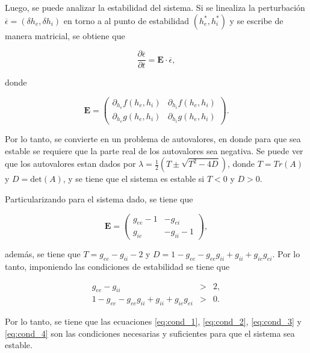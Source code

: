 \documentclass[11pt, twocolumn]{article}
\begin{document}
Luego, se puede analizar la estabilidad del sistema. Si se linealiza la perturbación \(\overline{\epsilon} = (\delta h_e, \delta h_i)\) en torno a al punto de estabilidad \((h_e^*, h_i^*)\) y se escribe de manera matricial, se obtiene que 

\begin{equation*}
    \frac{\partial \overline{\epsilon}}{\partial t} = \mathbf{E} \cdot \overline{\epsilon},
\end{equation*}

\noindent donde 

\begin{equation*}
    \mathbf{E} = \begin{pmatrix}
        \partial_{h_e} f(h_e, h_i) & \partial_{h_i} f(h_e, h_i) \\
        \partial_{h_e} g(h_e, h_i) & \partial_{h_i}g(h_e, h_i)
    \end{pmatrix}.
\end{equation*}

Por lo tanto, se convierte en un problema de autovalores, en donde para que sea estable se requiere que la parte real de los autovalores sea negativa. Se puede ver que los autovalores estan dados por \( \lambda = \frac{1}{2} (T \pm \sqrt{T^2-4D})\), donde \(T = Tr(A)\) y \(D = \text{det}(A)\), y se tiene que el sistema es estable si \(T < 0\) y \(D > 0\).

Particularizando para el sistema dado, se tiene que

\begin{equation*}
    \mathbf{E} = \begin{pmatrix}
        g_{ee} - 1 & -g_{ei} \\
        g_{ie} & -g_{ii} - 1
    \end{pmatrix},
\end{equation*}

además, se tiene que \( T = g_{ee} - g_{ii} -2\) y \(D = 1 -g_{ee} - g_{ee}g_{ii} + g_{ii} + g_{ie}g_{ei}\). Por lo tanto, imponiendo las condiciones de estabilidad se tiene que

\begin{eqnarray}
    g_{ee} - g_{ii} &>& 2, \label{eq:cond_3}\\
    1 -g_{ee} - g_{ee}g_{ii} + g_{ii} + g_{ie}g_{ei} &>& 0 \label{eq:cond_4}.
\end{eqnarray}

Por lo tanto, se tiene que las ecuaciones \ref{eq:cond_1}, \ref{eq:cond_2}, \ref{eq:cond_3} y \ref{eq:cond_4} son las condiciones necesarias y suficientes para que el sistema sea estable.
\end{document}
